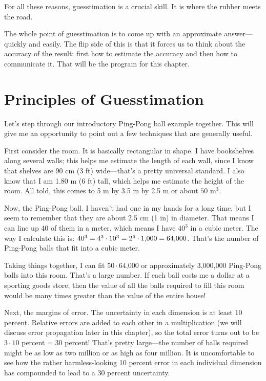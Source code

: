 For all these reasons, guesstimation is a crucial skill.  It is where
the rubber meets the road.
   
The whole point of guesstimation is to come up with an approximate
answer---quickly and easily. The flip side of this is that it forces
us to think about the accuracy of the result: first how to estimate
the accuracy and then how to communicate it. That will be the program
for this chapter.

\section{Principles of Guesstimation}

   
Let's step through our introductory Ping-Pong ball example together.
This will give me an opportunity to point out a few techniques that
are generally useful.
    
First consider the room. It is basically rectangular in shape. I have
bookshelves along several walls; this helps me estimate the length of
each wall, since I know that shelves are 90 cm (3 ft) wide---that's a
pretty universal standard. I also know that I am 1.80 m (6 ft) tall,
which helps me estimate the height of the room. All told, this comes
to 5 m by 3.5 m by 2.5 m or about $50\text{ m}^3$.
    
Now, the Ping-Pong ball. I haven't had one in my hands for a long
time, but I seem to remember that they are about 2.5 cm (1 in) in
diameter. That means I can line up 40 of them in a meter, which means
I have $40^3$ in a cubic meter. The way I calculate this is: $40^3 =
4^3 \cdot 10^3 = 2^6 \cdot \hbox{1,000} = \text{64,000}$. That's the number of Ping-Pong balls that fit
into a cubic meter.
    
Taking things together, I can fit $50 \cdot \text{64,000}$ or
approximately 3,000,000 Ping-Pong balls into this room. That's a large
number.  If each ball costs me a dollar at a sporting goods store,
then the value of all the balls required to fill this room would be
many times greater than the value of the entire house!
    
Next, the margins of error. The uncertainty in each dimension is at
least 10 percent. Relative errors are added to each other in a
multiplication (we will discuss error propagation later in this
chapter), so the total error turns out to be $3 \cdot 10$ percent = 30
percent!  That's pretty large---the number of balls required might be
as low as two million or as high as four million. It is uncomfortable
to see how the rather harmless-looking 10 percent error in each
individual dimension has compounded to lead to a 30 percent
uncertainty.

